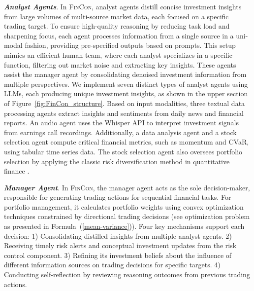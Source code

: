 \textbf{\textit{Analyst Agents}}. In \textsc{FinCon}, analyst agents distill concise investment insights from large volumes of multi-source market data, each focused on a specific trading target. To ensure high-quality reasoning by reducing task load and sharpening focus, each agent processes information from a single source in a uni-modal fashion, providing pre-specified outputs based on prompts. This setup mimics an efficient human team, where each analyst specializes in a specific function, filtering out market noise and extracting key insights. These agents assist the manager agent by consolidating denoised investment information from multiple perspectives. We implement seven distinct types of analyst agents using LLMs, each producing unique investment insights, as shown in the upper section of Figure~\ref{fig:FinCon_structure}. Based on input modalities, three textual data processing agents extract insights and sentiments from daily news and financial reports. An audio agent uses the Whisper API to interpret investment signals from earnings call recordings. Additionally, a data analysis agent and a stock selection agent compute critical financial metrics, such as momentum and CVaR, using tabular time series data. The stock selection agent also oversees portfolio selection by applying the classic risk diversification method in quantitative finance \cite{markowitz1952portfolio}.

\textbf{\textit{Manager Agent}}. In \textsc{FinCon}, the manager agent acts as the sole decision-maker, responsible for generating trading actions for sequential financial tasks. For portfolio management, it calculates portfolio weights using convex optimization techniques constrained by directional trading decisions (see optimization problem as presented in Formula~(\ref{mean-variance})). Four key mechanisms support each decision: 1) Consolidating distilled insights from multiple analyst agents. 2) Receiving timely risk alerts and conceptual investment updates from the risk control component. 3) Refining its investment beliefs about the influence of different information sources on trading decisions for specific targets. 4) Conducting self-reflection by reviewing reasoning outcomes from previous trading actions.


